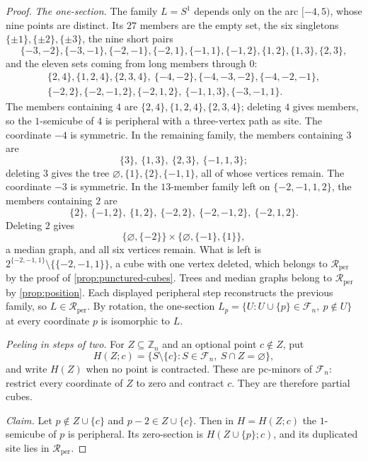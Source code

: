 \documentclass[11pt]{article}
\theoremstyle{definition}
\theoremstyle{remark}
\newcommand{\Rper}{\mathcal R_{\mathrm{per}}}
\begin{document}
\begin{proof}
\emph{The one-section.}  The family \(L=S^1\) depends only on the arc
\([-4,5)\), whose nine points are distinct.  Its \(27\) members are the
empty set, the six singletons \(\{\pm1\},\{\pm2\},\{\pm3\}\), the nine
short pairs
\[
 \{-3,-2\},\{-3,-1\},\{-2,-1\},\{-2,1\},\{-1,1\},\{-1,2\},\{1,2\},\{1,3\},
 \{2,3\},
\]
and the eleven sets coming from long members through \(0\):
\[
\begin{gathered}
 \{2,4\},\{1,2,4\},\{2,3,4\},\ \{-4,-2\},\{-4,-3,-2\},\{-4,-2,-1\},\\
 \{-2,2\},\{-2,-1,2\},\{-2,1,2\},\ \{-1,1,3\},\{-3,-1,1\}.
\end{gathered}
\]
The members containing \(4\) are \(\{2,4\},\{1,2,4\},\{2,3,4\}\); deleting
\(4\) gives members, so the \(1\)-semicube of \(4\) is peripheral with a
three-vertex path as site.  The coordinate \(-4\) is symmetric.  In the
remaining family, the members containing \(3\) are
\[
 \{3\},\ \{1,3\},\ \{2,3\},\ \{-1,1,3\};
\]
deleting \(3\) gives the tree \(\varnothing,\{1\},\{2\},\{-1,1\}\),
all of whose vertices remain.  The
coordinate \(-3\) is symmetric.  In the \(13\)-member family left on
\(\{-2,-1,1,2\}\), the members containing \(2\) are
\[
 \{2\},\ \{-1,2\},\ \{1,2\},\ \{-2,2\},\ \{-2,-1,2\},\ \{-2,1,2\}.
\]
Deleting \(2\) gives
\[
 \{\varnothing,\{-2\}\}\times\{\varnothing,\{-1\},\{1\}\},
\]
a median graph, and all six vertices remain.  What is left is
\(2^{\{-2,-1,1\}}\setminus\{\{-2,-1,1\}\}\), a cube with one vertex
deleted, which belongs to \(\Rper\) by the proof of
\cref{prop:punctured-cubes}.  Trees and median graphs belong to \(\Rper\)
by \cref{prop:position}.  Each displayed peripheral step reconstructs the
previous family, so \(L\in\Rper\).  By rotation, the one-section
\(L_p=\{U:U\cup\{p\}\in\mathcal F_n,\ p\notin U\}\) at every coordinate
\(p\) is isomorphic to \(L\).

\emph{Peeling in steps of two.}  For \(Z\subseteq\mathbb Z_n\) and an
optional point \(c\notin Z\), put
\[
 H(Z;c)=\{S\setminus\{c\}:S\in\mathcal F_n,\ S\cap Z=\varnothing\},
\]
and write \(H(Z)\) when no point is contracted.  These are pc-minors of
\(\mathcal F_n\): restrict every coordinate of \(Z\) to zero and contract
\(c\).  They are therefore partial cubes.

\emph{Claim.}  Let \(p\notin Z\cup\{c\}\) and \(p-2\in Z\cup\{c\}\).  Then
in \(H=H(Z;c)\) the \(1\)-semicube of \(p\) is peripheral.  Its zero-section
is \(H(Z\cup\{p\};c)\), and its duplicated site lies in \(\Rper\).


\end{proof}
\end{document}
